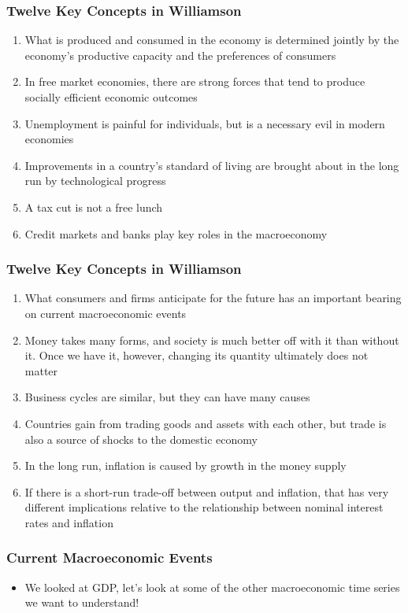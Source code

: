 \documentclass{beamer}
\begin{document}
\begin{frame}
\frametitle[alignment=center]{Twelve Key Concepts in Williamson}
\begin{enumerate}
\item What is produced and consumed in the economy is determined jointly by the economy's productive capacity and the preferences of consumers
\item In free market economies, there are strong forces that tend to produce socially efficient economic outcomes
\item Unemployment is painful for individuals, but is a necessary evil in modern economies
\item Improvements in a country's standard of living are brought about in the long run by technological progress
\item A tax cut is not a free lunch
\item Credit markets and banks play key roles in the macroeconomy
\end{enumerate}
\end{frame}

\begin{frame}
\frametitle[alignment=center]{Twelve Key Concepts in Williamson}
\begin{enumerate}\addtocounter{enumi}{6}
\item What consumers and firms anticipate for the future has an important bearing on current macroeconomic events
\item Money takes many forms, and society is much better off with it than without it.  Once we have it, however, changing its quantity ultimately does not matter
\item Business cycles are similar, but they can have many causes
\item Countries gain from trading goods and assets with each other, but trade is also a source of shocks to the domestic economy
\item In the long run, inflation is caused by growth in the money supply
\item If there is a short-run trade-off between output and inflation, that has very different implications relative to the relationship between nominal interest rates and inflation
\end{enumerate}
\end{frame}


\begin{frame}
\frametitle[alignment=center]{Current Macroeconomic Events}
\begin{itemize}\addtocounter{enumi}{6}
\item We looked at GDP, let's look at some of the other macroeconomic time series we want to understand!
\end{itemize}
\end{frame}
\end{document}
